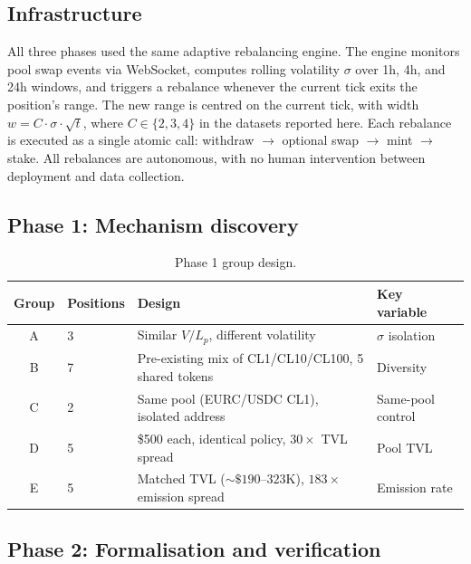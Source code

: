 \documentclass{manuscript}
\begin{document}
\subsection{Infrastructure}\label{sec:infrastructure}

All three phases used the same adaptive rebalancing engine. The engine monitors pool swap events via WebSocket, computes rolling volatility $\sigma$ over 1h, 4h, and 24h windows, and triggers a rebalance whenever the current tick exits the position's range. The new range is centred on the current tick, with width $w = C \cdot \sigma \cdot \sqrt{t}$, where $C \in \{2, 3, 4\}$ in the datasets reported here. Each rebalance is executed as a single atomic call: withdraw $\to$ optional swap $\to$ mint $\to$ stake. All rebalances are autonomous, with no human intervention between deployment and data collection.

\subsection{Phase 1: Mechanism discovery}\label{sec:phase1}

\begin{table}[H]
\centering
\caption{Phase 1 group design.}
\label{tab:phase1-groups}
\begin{tabular}{@{}clL{8.5cm}l@{}}
\toprule
Group & Positions & Design & Key variable \\
\midrule
A & 3 & Similar $V/L_p$, different volatility & $\sigma$ isolation \\
B & 7 & Pre-existing mix of CL1/CL10/CL100, 5 shared tokens & Diversity \\
C & 2 & Same pool (EURC/USDC CL1), isolated address & Same-pool control \\
D & 5 & \$500 each, identical policy, $30\times$ TVL spread & Pool TVL \\
E & 5 & Matched TVL (${\sim}\$190$--$323$K), $183\times$ emission spread & Emission rate \\
\bottomrule
\end{tabular}
\end{table}

\subsection{Phase 2: Formalisation and verification}\label{sec:phase2}
\end{document}
